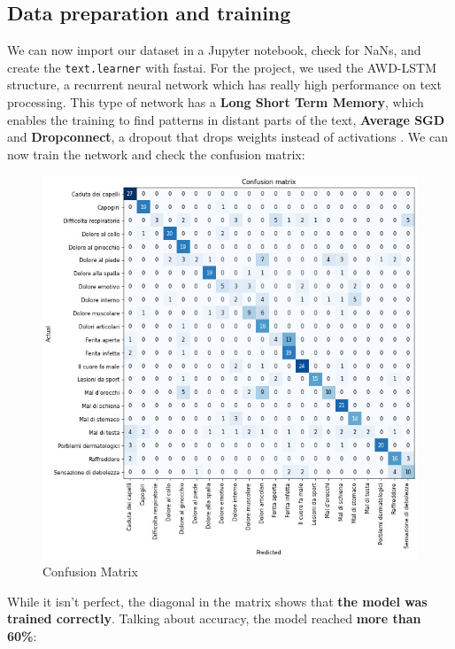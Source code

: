 \documentclass[conference]{IEEEtran}
\begin{document}
\subsection{Data preparation and training}
We can now import our dataset in a Jupyter notebook, check for NaNs, and create the \texttt{text.learner} with fastai. For the project, we used the AWD-LSTM structure, a recurrent neural network which has really high performance on text processing. This type of network has a \textbf{Long Short Term Memory}\cite{lstm}, which enables the training to find patterns in distant parts of the text, \textbf{Average SGD} and \textbf{Dropconnect}, a dropout that drops weights instead of activations \cite{awd-lstm}. We can now train the network and check the confusion matrix:
\begin{figure}[H]
    \begin{center}
        \includegraphics[width=\columnwidth]{ConfusionMatrix.jpg}
    \end{center}
    \caption{Confusion Matrix}
    \label{fig:confusion-matrix}
\end{figure}
While it isn't perfect, the diagonal in the matrix shows that \textbf{the model was trained correctly}. Talking about accuracy, the model reached \textbf{more than 60\%}:
\end{document}
